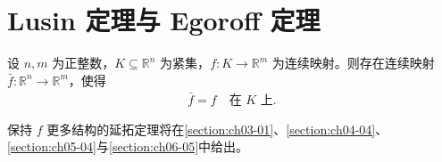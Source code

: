\documentclass[../../main.tex]{subfiles}%
\begin{document}
\section{Lusin 定理与 Egoroff 定理}\label{section:ch01-02}

\begin{theorem}[连续函数的延拓]\label{theorem:ch01-1-13}
设 $n,m$ 为正整数，$K\subseteq\mathbb{R}^n$ 为紧集，$f:K\to\mathbb{R}^m$ 为连续映射。则存在连续映射 $\bar f:\mathbb{R}^n\to\mathbb{R}^m$，使得
\begin{align*}
\bar f=f\quad\text{在 }K\text{ 上}.
\end{align*}
\end{theorem}

\begin{remark}\label{remark:ch01-thm-1-13-结构}
保持 $f$ 更多结构的延拓定理将在\cref{section:ch03-01}、\cref{section:ch04-04}、\cref{section:ch05-04}与\cref{section:ch06-05}中给出。%
\end{remark}
\end{document}
